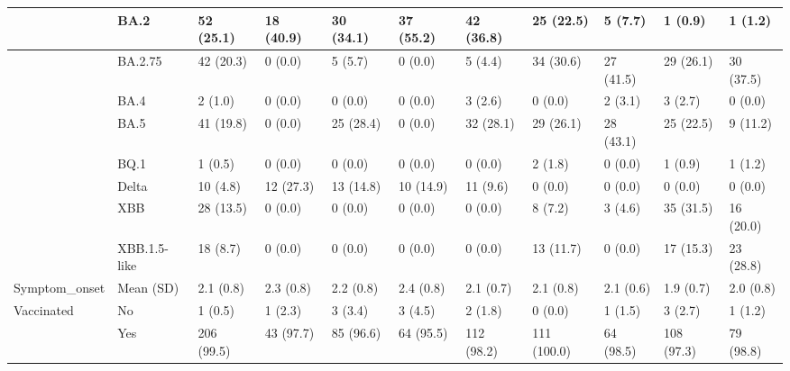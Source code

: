 \begin{tabular}{l|l|l|l|l|l|l|l|l|l|l}
\hline
 & BA.2 & 52 (25.1) & 18 (40.9) & 30 (34.1) & 37 (55.2) & 42 (36.8) & 25 (22.5) & 5 (7.7) & 1 (0.9) & 1 (1.2)\\
\hline
 & BA.2.75 & 42 (20.3) & 0 (0.0) & 5 (5.7) & 0 (0.0) & 5 (4.4) & 34 (30.6) & 27 (41.5) & 29 (26.1) & 30 (37.5)\\
\hline
 & BA.4 & 2 (1.0) & 0 (0.0) & 0 (0.0) & 0 (0.0) & 3 (2.6) & 0 (0.0) & 2 (3.1) & 3 (2.7) & 0 (0.0)\\
\hline
 & BA.5 & 41 (19.8) & 0 (0.0) & 25 (28.4) & 0 (0.0) & 32 (28.1) & 29 (26.1) & 28 (43.1) & 25 (22.5) & 9 (11.2)\\
\hline
 & BQ.1 & 1 (0.5) & 0 (0.0) & 0 (0.0) & 0 (0.0) & 0 (0.0) & 2 (1.8) & 0 (0.0) & 1 (0.9) & 1 (1.2)\\
\hline
 & Delta & 10 (4.8) & 12 (27.3) & 13 (14.8) & 10 (14.9) & 11 (9.6) & 0 (0.0) & 0 (0.0) & 0 (0.0) & 0 (0.0)\\
\hline
 & XBB & 28 (13.5) & 0 (0.0) & 0 (0.0) & 0 (0.0) & 0 (0.0) & 8 (7.2) & 3 (4.6) & 35 (31.5) & 16 (20.0)\\
\hline
 & XBB.1.5-like & 18 (8.7) & 0 (0.0) & 0 (0.0) & 0 (0.0) & 0 (0.0) & 13 (11.7) & 0 (0.0) & 17 (15.3) & 23 (28.8)\\
\hline
Symptom\_onset & Mean (SD) & 2.1 (0.8) & 2.3 (0.8) & 2.2 (0.8) & 2.4 (0.8) & 2.1 (0.7) & 2.1 (0.8) & 2.1 (0.6) & 1.9 (0.7) & 2.0 (0.8)\\
\hline
Vaccinated & No & 1 (0.5) & 1 (2.3) & 3 (3.4) & 3 (4.5) & 2 (1.8) & 0 (0.0) & 1 (1.5) & 3 (2.7) & 1 (1.2)\\
\hline
 & Yes & 206 (99.5) & 43 (97.7) & 85 (96.6) & 64 (95.5) & 112 (98.2) & 111 (100.0) & 64 (98.5) & 108 (97.3) & 79 (98.8)\\
\hline
\end{tabular}

